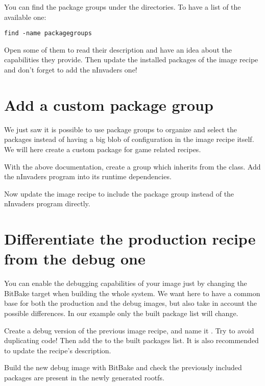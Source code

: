 You can find the package groups under the  directories. To
have a list of the available one:
\begin{verbatim}
find -name packagegroups
\end{verbatim}

Open some of them to read their description and have an idea about the
capabilities they provide. Then update the installed packages of the image
recipe and don't forget to add the nInvaders one!

\section{Add a custom package group}

We just saw it is possible to use package groups to organize and select the
packages instead of having a big blob of configuration in the image recipe
itself. We will here create a custom package for game related recipes.

With the above documentation, create a  group
which inherits from the  class. Add the nInvaders program
into its runtime dependencies.

Now update the image recipe to include the package group instead of the
nInvaders program directly.

\section{Differentiate the production recipe from the debug one}

You can enable the debugging capabilities of your image just by changing the
BitBake target when building the whole system. We want here to have a common
base for both the production and the debug images, but also take in account the
possible differences. In our example only the built package list will change.

Create a debug version of the previous image recipe, and name it
. Try to avoid duplicating code! Then add the
 to the built packages list. It is also recommended to
update the recipe's description.

Build the new debug image with BitBake and check the previously
included packages are present in the newly generated rootfs.
